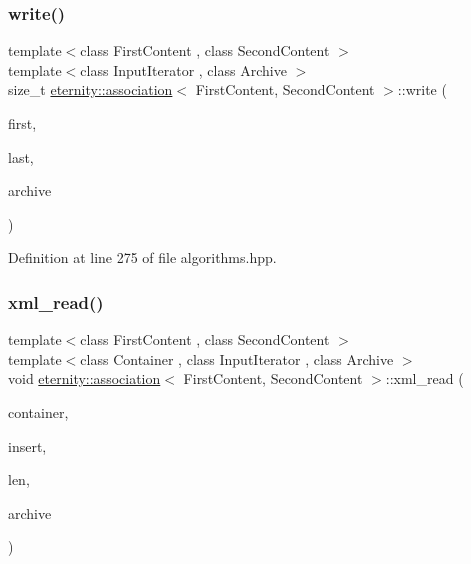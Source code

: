 \mbox{\label{structeternity_1_1association_a927d1de7c19bce31622b31417e107ebe}} 
\subsubsection{\texorpdfstring{write()}{write()}}
{\footnotesize\ttfamily template$<$class First\+Content , class Second\+Content $>$ \\
template$<$class Input\+Iterator , class Archive $>$ \\
size\+\_\+t \hyperlink{structeternity_1_1association}{eternity\+::association}$<$ First\+Content, Second\+Content $>$\+::write (\begin{DoxyParamCaption}\item[{Input\+Iterator}]{first,  }\item[{Input\+Iterator}]{last,  }\item[{Archive \&}]{archive }\end{DoxyParamCaption})}



Definition at line 275 of file algorithms.\+hpp.

\mbox{\label{structeternity_1_1association_a2f1c27b77cd84364c498feb134864d4f}} 
\subsubsection{\texorpdfstring{xml\+\_\+read()}{xml\_read()}}
{\footnotesize\ttfamily template$<$class First\+Content , class Second\+Content $>$ \\
template$<$class Container , class Input\+Iterator , class Archive $>$ \\
void \hyperlink{structeternity_1_1association}{eternity\+::association}$<$ First\+Content, Second\+Content $>$\+::xml\+\_\+read (\begin{DoxyParamCaption}\item[{Container \&}]{container,  }\item[{Input\+Iterator}]{insert,  }\item[{size\+\_\+t}]{len,  }\item[{Archive \&}]{archive }\end{DoxyParamCaption})}



